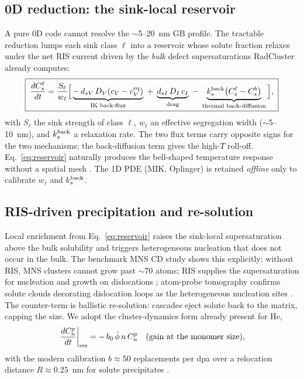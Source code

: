 \documentclass[11pt]{article}
\newcommand{\cv}{c_{V}}
\newcommand{\ci}{c_{I}}
\newcommand{\Dv}{D_{V}}
\newcommand{\Di}{D_{I}}
\begin{document}
\subsection{0D reduction: the sink-local reservoir}
\label{sec:0d-reduction}
A pure 0D code cannot resolve the $\sim$5--20~nm GB profile. The tractable
reduction lumps each sink class $\ell$ into a reservoir whose solute fraction
relaxes under the net RIS current driven by the \emph{bulk} defect
supersaturations RadCluster already computes:
\begin{equation}
\boxed{\;
\frac{dC_s^{\ell}}{dt}
= \frac{S_\ell}{w_\ell}\Big[
   \underbrace{-\,d_{sV}\,\Dv(\cv-\cv^{\rm eq})}_{\text{IK back-flux}}
   \;+\;\underbrace{d_{sI}\,\Di\,\ci}_{\text{drag}}
   \;-\;\underbrace{k^{\rm back}_{s}\big(C_s^{\ell}-C_s^{b}\big)}_{\text{thermal back-diffusion}}
  \Big],
\;}
\label{eq:reservoir}
\end{equation}
with $S_\ell$ the sink strength of class $\ell$, $w_\ell$ an effective
segregation width ($\sim$5--10~nm), and $k^{\rm back}_s$ a relaxation rate. The
two flux terms carry opposite signs for the two mechanisms; the back-diffusion
term gives the high-$T$ roll-off. Eq.~\eqref{eq:reservoir} naturally produces
the bell-shaped temperature response without a spatial mesh
\citep{Hu2021,Oplinger2026}. The 1D PDE (MIK, Oplinger) is retained
\emph{offline} only to calibrate $w_\ell$ and $k^{\rm back}_s$.

\subsection{RIS-driven precipitation and re-solution}
Local enrichment from Eq.~\eqref{eq:reservoir} raises the sink-local
supersaturation above the bulk solubility and triggers heterogeneous
nucleation that does not occur in the bulk. The benchmark MNS CD study shows
this explicitly: without RIS, MNS clusters cannot grow past $\sim$70 atoms;
RIS supplies the supersaturation for nucleation and growth on dislocations
\citep{Ke2018mns,Ke2018fm}; atom-probe tomography confirms solute clouds
decorating dislocation loops as the heterogeneous nucleation sites
\citep{Davis2020}. The counter-term is ballistic re-solution: cascades
eject solute back to the matrix, capping the size. We adopt the cluster-dynamics
form already present for He,
\begin{equation}
\left.\frac{dC_n^{p}}{dt}\right|_{\rm res} = -\,b_0\,\dot\phi\,n\,C_n^{p}
\quad(\text{gain at the monomer size}),
\label{eq:resolution}
\end{equation}
with the modern calibration $b\!\approx\!50$ replacements per dpa over a
relocation distance $R\!\approx\!0.25$~nm for solute precipitates
\citep{Ke2019flux,SchwenAverback2016}.
\end{document}
